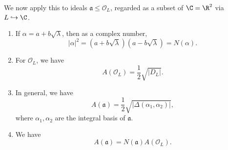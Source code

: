 \documentclass[a4paper]{article}
\begin{document}
We now apply this to ideals $\mathfrak{a} \leq \mathcal{O}_L$, regarded as a subset of $\C = \R^2$ via $L \hookrightarrow \C$.

\begin{prop}\leavevmode
  \begin{enumerate}
    \item If $\alpha = a + b\sqrt{\lambda}$, then as a complex number,
      \[
        |\alpha|^2 = (a + b\sqrt{\lambda})(a - b\sqrt{\lambda}) = N(\alpha).
      \]
    \item For $\mathcal{O}_L$, we have
      \[
        A(\mathcal{O}_L) = \frac{1}{2}\sqrt{|D_L|}.
      \]
    \item In general, we have
      \[
        A(\mathfrak{a}) = \frac{1}{2} \sqrt{|\Delta(\alpha_1, \alpha_2)|},
      \]
      where $\alpha_1, \alpha_2$ are the integral basis of $\mathfrak{a}$.
    \item We have
      \[
        A(\mathfrak{a}) = N(\mathfrak{a}) A(\mathcal{O}_L).
      \]
  \end{enumerate}
\end{prop}
\end{document}
